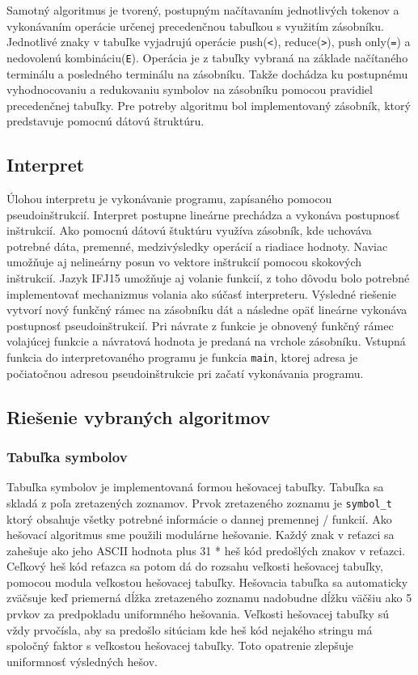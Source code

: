 \documentclass[12pt,a4paper,titlepage,final]{article}
\begin{document}
Samotný algoritmus je tvorený, postupným načítavaním jednotlivých tokenov a vykonávaním operácie určenej precedenčnou tabuľkou s využitím zásobníku. Jednotlivé znaky v tabuľke vyjadrujú operácie push(\verb+<+), reduce(\verb+>+), push only(\verb+=+) a nedovolenú kombináciu(\verb+E+). Operácia je z tabuľky vybraná na základe načítaného terminálu a posledného terminálu na zásobníku. Takže dochádza ku postupnému vyhodnocovaniu a redukovaniu symbolov na zásobníku pomocou pravidiel precedenčnej tabuľky. Pre potreby algoritmu bol implementovaný zásobník, ktorý predstavuje pomocnú dátovú štruktúru.


\subsection{Interpret}
Úlohou interpretu je vykonávanie programu, zapísaného pomocou pseudoinštrukcií. Interpret postupne lineárne prechádza a vykonáva postupnosť inštrukcií. Ako pomocnú dátovú štuktúru využíva zásobník, kde uchováva potrebné dáta, premenné, medzivýsledky operácií a riadiace hodnoty. Naviac umožňuje aj nelineárny posun vo vektore inštrukcií pomocou skokových inštrukcií. Jazyk IFJ15 umožňuje aj volanie funkcií, z toho dôvodu bolo potrebné implementovať mechanizmus volania ako súčasť interpreteru. Výsledné riešenie vytvorí nový funkčný rámec na zásobníku dát a následne opäť lineárne vykonáva postupnosť pseudoinštrukcií. Pri návrate z funkcie je obnovený funkčný rámec volajúcej funkcie a návratová hodnota je predaná na vrchole zásobníku. Vstupná funkcia do interpretovaného programu je funkcia \texttt{main}, ktorej adresa je počiatočnou adresou pseudoinštrukcie pri začatí vykonávania programu.

\subsection{Riešenie vybraných algoritmov}

\subsubsection{Tabuľka symbolov}
Tabuľka symbolov je implementovaná formou hešovacej tabuľky. Tabuľka sa skladá z poľa zretazených zoznamov. Prvok zretazeného zoznamu je \texttt{symbol\_t} ktorý obsahuje všetky potrebné informácie o dannej premennej / funkcií. Ako hešovací algoritmus sme použili modulárne hešovanie. Každý znak v reťazci sa zahešuje ako jeho ASCII hodnota plus 31 * heš kód predošlých znakov v reťazci. Ceľkový heš kód reťazca sa potom dá do rozsahu veľkosti hešovacej tabuľky, pomocou modula veľkostou hešovacej tabuľky. Hešovacia tabuľka sa automaticky zväčsuje keď priemerná dĺžka zretazeného zoznamu nadobudne dĺžku väčšiu ako 5 prvkov za predpokladu uniformného hešovania. Veľkosti hešovacej tabuľky sú vždy prvočísla, aby sa predošlo sitúciam kde heš kód nejakého stringu má spoločný faktor s veľkostou hešovacej tabuľky. Toto opatrenie zlepšuje uniformnosť výsledných hešov. 
\end{document}
